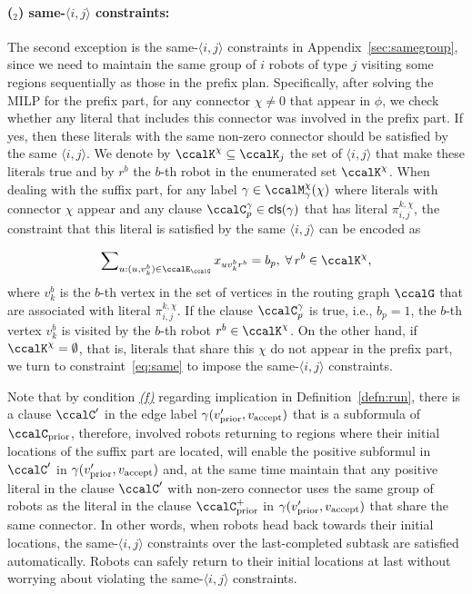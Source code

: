 \documentclass[Afour,sageh,times]{sagej}
\newcounter{mycounter}
\newcommand{\clause}[1]{\mathsf{cls}(#1)}
\newcommand{\vertex}[1]{v_{\textup{#1}}}
\newcommand{\ag}[2]{\langle#1,#2\rangle}
\renewcommand{\ap}[3]{\mathcal{\pi}_{{#1},{#2}}^{#3}}
\newcommand{\aap}[4]{\mathcal{\pi}_{{#1},{#2}}^{#3,#4}}
\begin{document}
{{{\paragraph{($_2$) same-$\ag{i}{j}$ constraints:} The second exception is the same-$\ag{i}{j}$ constraints in Appendix~\ref{sec:samegroup}, since we need to maintain the same group of $i$ robots of type $j$ visiting some regions sequentially as those in the prefix plan. Specifically, after solving the MILP for the prefix part, for any connector $\chi\not=0$ that appear in $\phi$, we check whether any literal that includes this connector was involved in the prefix part. If yes, then these literals with the same non-zero connector should be satisfied by the same $\ag{i}{j}$. We denote by $\ccalK^\chi \subseteq \ccalK_j$ the set of $\ag{i}{j}$ that make these literals true and  by  $r^b$ the $b$-th robot in the enumerated set $\ccalK^\chi$. When dealing with the suffix part, for any label $\gamma \in\ccalM_\mathsf{\gamma}^\chi(\chi)$ where literals with connector $\chi$ appear and any clause $\ccalC_p^\gamma \in \clause{\gamma}$ that has  literal $\aap{i}{j}{k}{\chi}$, the constraint that this literal is satisfied by the same $\ag{i}{j}$  can be encoded as}
\begingroup\makeatletter{}\check@mathfonts
\def\maketag@@@#1{\hbox{\m@th\normalsize\normalfont#1}}%
\begin{align}\label{eq:same_suffix}
    \sum\nolimits_{u:(u, v_k^b) \in \ccalE_\ccalG} x_{u v_k^b r^b} =  b_p, \;\forall\, r^b \in \ccalK^\chi,
  \end{align}
\endgroup
where $v_k^b$ is the $b$-th vertex in the set of vertices in the routing graph $\ccalG$  that are associated with literal $\ap{i}{j}{k,\chi}$. If the clause $\ccalC_p^\gamma$ is true, i.e.,  $b_p=1$, the $b$-th vertex $v_k^b$ is visited by the $b$-th robot $r^b \in \ccalK^\chi$. On the other hand, if $\ccalK^\chi = \emptyset$, that is, literals that share this $\chi$ do not appear in the prefix part, we turn to constraint~\eqref{eq:same} to impose the same-$\ag{i}{j}$ constraints.

Note that by condition \hyperref[cond:f]{\it (f)} regarding implication in Definition~\ref{defn:run}, there is a clause  $\ccalC'$ in the edge label $\gamma(\vertex{prior}', \vertex{accept})$ that is a subformula of $\ccalC_{\text{prior}}$,  therefore, involved robots returning to regions where their initial locations of the suffix part are located,  will enable the positive subformul in $\ccalC'$ in $\gamma(\vertex{prior}', \vertex{accept})$ and, at the same time maintain that any positive literal in the clause $\ccalC'$ with non-zero connector uses the same group of robots as the literal in the clause $\ccalC_{\text{prior}}^+$ in $\gamma(\vertex{prior}', \vertex{accept})$ that share  the same connector.  In other words, when robots head back towards their initial locations, the same-$\ag{i}{j}$ constraints over the last-completed subtask are satisfied automatically. Robots can safely return to their initial locations at last without worrying about violating the same-$\ag{i}{j}$ constraints.

}}
\end{document}
